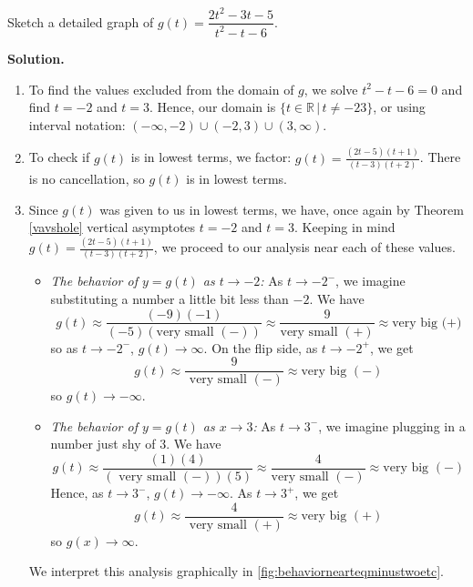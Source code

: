\begin{ex}  Sketch a detailed graph of $g(t) = \dfrac{2t^2-3t-5}{t^2-t-6}$.

{\bf Solution.}

\begin{enumerate}

\item  To find the values excluded from the domain of $g$, we solve  $t^2-t-6 = 0$ and find $t = -2$ and $t=3$.  Hence, our domain is $\{ t \in \mathbb{R} \, | \, t \neq -2 3 \}$, or using interval notation: $(-\infty, -2) \cup (-2,3) \cup (3,\infty)$.

\item  To check if $g(t)$ is in lowest terms, we factor:  $g(t) = \frac{(2t-5)(t+1)}{(t-3)(t+2)}$.  There is no cancellation, so $g(t)$ is in lowest terms.

\item  Since $g(t)$ was given to us in lowest terms, we have, once again by Theorem \ref{vavshole} vertical asymptotes $t=-2$ and $t=3$.  Keeping in mind $g(t) = \frac{(2t-5)(t+1)}{(t-3)(t+2)}$, we proceed to our analysis near each of these values.

\begin{itemize}

\item  \textit{The behavior of $y=g(t)$ as $t \rightarrow -2$:}  As $t \rightarrow -2^{-}$, we imagine substituting a number a little bit less than $-2$. We have \[g(t) \approx \frac{(-9)(-1)}{(-5)(\text{very small $(-)$})} \approx \frac{9}{\text{very small $(+)$}} \approx \text{very big (+)}\] so as $t \rightarrow -2^{-}$, $g(t) \rightarrow \infty$. On the flip side, as $t \rightarrow -2^{+}$, we get \[g(t) \approx \frac{9}{\text{ very small $(-)$}} \approx \text{very big $(-)$}\] so $g(t) \rightarrow -\infty$.

\item  \textit{The behavior of $y=g(t)$ as $x \rightarrow 3$:}  As $t \rightarrow 3^{-}$, we imagine plugging in a number just shy  of $3$. We have \[g(t) \approx \frac{(1)(4)}{(\text{ very small $(-)$}) (5)} \approx \frac{4}{\text{very small $(-)$}} \approx \text{very big $(-)$}\] Hence, as $t \rightarrow 3^{-}$, $g(t) \rightarrow -\infty$. As $t \rightarrow 3^{+}$, we get \[g(t) \approx \frac{4}{\text{ very small $(+)$}} \approx \text{very big $(+)$}\] so $g(x) \rightarrow \infty$.

\end{itemize}

We interpret this analysis graphically in \autoref{fig:behaviornearteqminustwoetc}.


\end{enumerate}
\end{ex}
